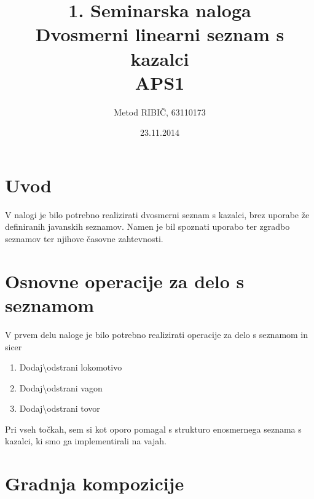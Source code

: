 \documentclass{article}
\title{1. Seminarska naloga \\ Dvosmerni linearni seznam s kazalci \\ APS1} %
\author{Metod \textsc{RIBIČ}, 63110173} %
\date{23.11.2014} %
\begin{document}
\maketitle %



\section*{Uvod}

V nalogi je bilo potrebno realizirati dvosmerni seznam s kazalci, brez uporabe že definiranih javanskih seznamov. Namen je bil spoznati uporabo ter zgradbo seznamov ter njihove časovne zahtevnosti.


\section{Osnovne operacije za delo s seznamom}


V prvem delu naloge je bilo potrebno realizirati operacije za delo s seznamom in sicer

\begin{enumerate}
  \item Dodaj\textbackslash odstrani lokomotivo
  \item Dodaj\textbackslash odstrani vagon
  \item Dodaj\textbackslash odstrani tovor
\end{enumerate}
Pri vseh točkah, sem si kot oporo pomagal s strukturo enosmernega seznama s kazalci, ki smo ga implementirali na vajah.


\section{Gradnja kompozicije}
\end{document}
